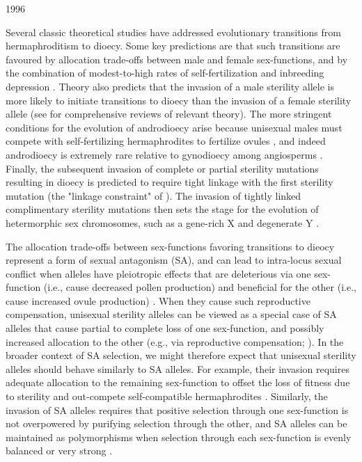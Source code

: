 1996\documentclass[9pt,twocolumn,twoside,lineno]{gsajnl}
\begin{document}
Several classic theoretical studies have addressed evolutionary transitions from hermaphroditism to dioecy. Some key predictions are that such transitions are favoured by allocation trade-offs between male and female sex-functions, and by the combination of modest-to-high rates of self-fertilization and inbreeding depression \citep{Lewis1941,Lloyd1975,Lloyd1976,Charlesworth1978a}. Theory also predicts that the invasion of a male sterility allele is more likely to initiate transitions to dioecy than the invasion of a female sterility allele (see \citealt{Charlesworth1999,Charlesworth2006} for comprehensive reviews of relevant theory). The more stringent conditions for the evolution of androdioecy arise because unisexual males must compete with self-fertilizing hermaphrodites to fertilize ovules \citep{Lloyd1975,Charlesworth1978a, KaferPannell2017}, and indeed androdioecy is extremely rare relative to gynodioecy among angiosperms \citep{Darwin1877, Charlesworth1978a, Renner2014}. Finally, the subsequent invasion of complete or partial sterility mutations resulting in dioecy is predicted to require tight linkage with the first sterility mutation (the "linkage constraint" of \citealt{Charlesworth1978a}). The invasion of tightly linked complimentary sterility mutations then sets the stage for the evolution of hetermorphic sex chromosomes, such as a gene-rich X and degenerate Y \citep{Rice1987,Bachtrog2006,Charlesworth2002,Qiuetal2013}. 

The allocation trade-offs between sex-functions favoring transitions to dieocy represent a form of sexual antagonism (SA), and can lead to intra-locus sexual conflict when alleles have pleiotropic effects that are deleterious via one sex-function (i.e., cause decreased pollen production) and beneficial for the other (i.e., cause increased ovule production) \citep{JordanConnallon2014,Olito2016}. When they cause such reproductive compensation, unisexual sterility alleles can be viewed as a special case of SA alleles that cause partial to complete loss of one sex-function, and possibly increased allocation to the other (e.g., via reproductive compensation; \citealt{Lewis1941,Lloyd1975,Charlesworth1978a}). In the broader context of SA selection, we might therefore expect that unisexual sterility alleles should behave similarly to SA alleles. For example, their invasion requires adequate allocation to the remaining sex-function to offset the loss of fitness due to sterility and out-compete self-compatible hermaphrodites \citep{Charlesworth1978a}. Similarly, the invasion of SA alleles requires that positive selection through one sex-function is not overpowered by purifying selection through the other, and SA alleles can be maintained as polymorphisms when selection through each sex-function is evenly balanced or very strong \citep{Kidwell1977,JordanConnallon2014}. 
\end{document}
